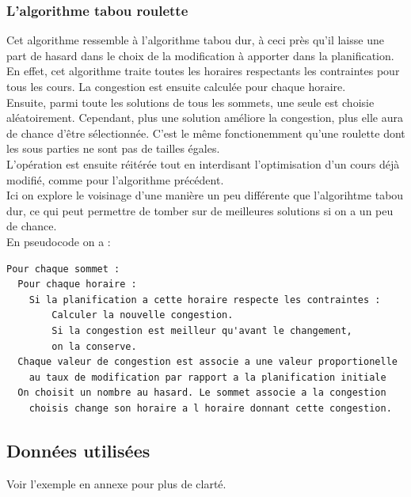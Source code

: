 \documentclass[a4paper,11pt]{article}
\begin{document}
		\subsubsection{L'algorithme tabou roulette}
			Cet algorithme ressemble à l'algorithme tabou dur, à ceci près qu'il laisse une part de hasard dans le choix de la modification à apporter dans la planification.\\
			En effet, cet algorithme traite toutes les horaires respectants les contraintes pour tous les cours. La congestion est ensuite calculée pour chaque horaire.\\
			Ensuite, parmi toute les solutions de tous les sommets, une seule est choisie aléatoirement. Cependant, plus une solution améliore la congestion, plus elle aura de chance d'être sélectionnée. C'est le même fonctionemment qu'une roulette dont les sous parties ne sont pas de tailles égales.\\
			L'opération est ensuite réitérée tout en interdisant l'optimisation d'un cours déjà modifié, comme pour l'algorithme précédent.\\
			Ici on explore le voisinage d'une manière un peu différente que l'algorihtme tabou dur, ce qui peut permettre de tomber sur de meilleures solutions si on a un peu de chance.\\
			En pseudocode on a :\\
\begin{lstlisting}
Pour chaque sommet :
  Pour chaque horaire :
  	Si la planification a cette horaire respecte les contraintes :
    	Calculer la nouvelle congestion.
    	Si la congestion est meilleur qu'avant le changement,
      	on la conserve.
  Chaque valeur de congestion est associe a une valeur proportionelle 
  	au taux de modification par rapport a la planification initiale
  On choisit un nombre au hasard. Le sommet associe a la congestion 
  	choisis change son horaire a l horaire donnant cette congestion.
  \end{lstlisting}
	
	\subsection{Données utilisées}
		Voir l'exemple en annexe pour plus de clarté.
\end{document}

